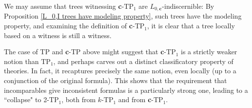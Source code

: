 \documentclass{article}
\newcommand{\TPi}{\text{TP}_1}
\theoremstyle{definition}
\theoremstyle{definition}
\theoremstyle{definition}
\theoremstyle{definition}
\begin{document}
We may assume that trees witnessing \textbf{c}-$\TPi$ are $L_{0,\textbf{c}}$-indiscernible: By Proposition \ref{L_0,I trees have modeling property}, such trees have the modeling property, and examining the definition of \textbf{c}-$\TPi$, it is clear that a tree locally based on a witness is still a witness.

The case of TP and \textbf{c}-TP above might suggest that \textbf{c}-$\TPi$ is a strictly weaker notion than $\TPi$, and perhaps carves out a distinct classificatory property of theories. In fact, it recaptures precisely the same notion, even locally (up to a conjunction of the original formula). This shows that the requirement that incomparables give inconsistent formulas is a particularly strong one, leading to a ``collapse" to 2-$\TPi$, both from $k$-$\TPi$ and from \textbf{c}-$\TPi$.
\end{document}
